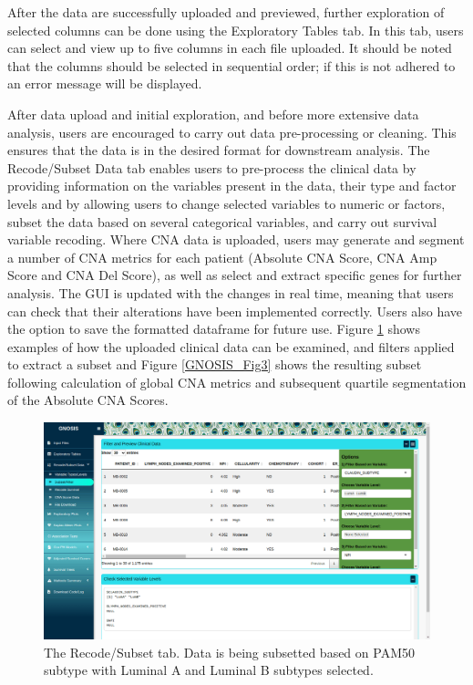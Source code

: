 After the data are successfully uploaded and previewed, further exploration of selected columns can be done using the Exploratory Tables tab. In this tab, users can select and view up to five columns in each file uploaded. It should be noted that the columns should be selected in sequential order; if this is not adhered to an error message will be displayed.  

After data upload and initial exploration, and before more extensive data analysis, users are encouraged to carry out data pre-processing or cleaning. This ensures that the data is in the desired format for downstream analysis. The Recode/Subset Data tab enables users to pre-process the clinical data by providing information on the variables present in the data, their type and factor levels and by allowing users to change selected variables to numeric or factors, subset the data based on several categorical variables, and carry out survival variable recoding. Where CNA data is uploaded, users may generate and segment a number of CNA metrics for each patient (Absolute CNA Score, CNA Amp Score and CNA Del Score), as well as select and extract specific genes for further analysis. The GUI is updated with the changes in real time, meaning that users can check that their alterations have been implemented correctly. Users also have the option to save the formatted dataframe for future use.   
Figure \ref{GNOSIS_Fig2} shows examples of how the uploaded clinical data can be examined, and filters applied to extract a subset and Figure \ref{GNOSIS_Fig3} shows the resulting subset following calculation of global CNA metrics and subsequent quartile segmentation of the Absolute CNA Scores. 

\begin{figure}[!hp]
\center
\includegraphics[width=1\textwidth]{../figures/Chapter_3/GNOSIS_Fig2.png}
\caption[The Recode/Subset tab.]{The Recode/Subset tab. Data is being subsetted based on PAM50 subtype with Luminal A and Luminal B subtypes selected.}
\label{GNOSIS_Fig2}
\end{figure}

